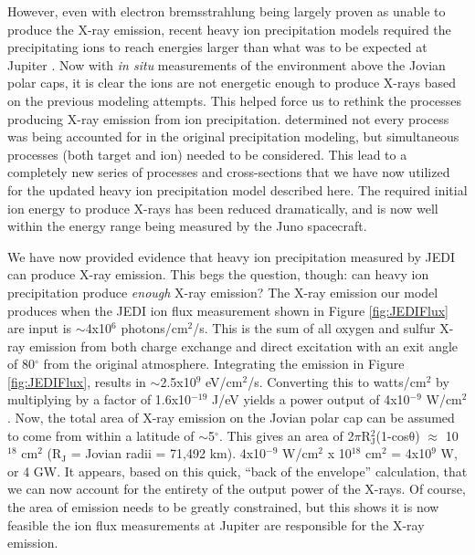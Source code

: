 \documentclass[draft]{agujournal2018}
\begin{document}
However, even with electron bremsstrahlung being largely proven as unable to produce the X-ray emission, recent heavy ion precipitation models required the precipitating ions to reach energies larger than what was to be expected at Jupiter \citep{cravens1995,ozak2010,ozak2013,houston2018}.
Now with \textit{in situ} measurements of the environment above the Jovian polar caps, it is clear the ions are not energetic enough to produce X-rays based on the previous modeling attempts.
This helped force us to rethink the processes producing X-ray emission from ion precipitation.
\citet{schultz2019} determined not every process was being accounted for in the original precipitation modeling, but simultaneous processes (both target and ion) needed to be considered.
This lead to a completely new series of processes and cross-sections that we have now utilized for the updated heavy ion precipitation model described here.
The required initial ion energy to produce X-rays has been reduced dramatically, and is now well within the energy range being measured by the Juno spacecraft.

We have now provided evidence that heavy ion precipitation measured by JEDI can produce X-ray emission.
This begs the question, though: can heavy ion precipitation produce \textit{enough} X-ray emission?
The X-ray emission our model produces when the JEDI ion flux measurement shown in Figure \ref{fig:JEDIFlux} are input is $\sim$4x10$^6$ photons/cm$^2$/s.
This is the sum of all oxygen and sulfur X-ray emission from both charge exchange and direct excitation with an exit angle of 80$^{\circ}$ from the original atmosphere.
Integrating the emission in Figure \ref{fig:JEDIFlux}, results in $\sim$2.5x10$^9$ eV/cm$^2$/s.
Converting this to watts/cm$^2$ by multiplying by a factor of 1.6x10$^{-19}$ J/eV yields a power output of 4x10$^{-9}$ W/cm$^2$.
Now, the total area of X-ray emission on the Jovian polar cap can be assumed to come from within a latitude of $\sim$5$^{\circ}$.
This gives an area of 2$\pi$R$_{\mathrm{J}}^2$(1-cos$\mathrm{\theta}$) $\approx$ 10$^{18}$ cm$^2$ (R$_{\mathrm{J}}$ = Jovian radii = 71,492 km).
4x10$^{-9}$ W/cm$^2$ x 10$^{18}$ cm$^2$ = 4x10$^9$ W, or 4 GW.
It appears, based on this quick, ``back of the envelope'' calculation, that we can now account for the entirety of the output power of the X-rays.
Of course, the area of emission needs to be greatly constrained, but this shows it is now feasible the ion flux measurements at Jupiter are responsible for the X-ray emission.
\end{document}
